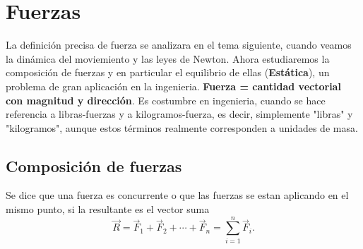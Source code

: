 \documentclass[12pt,a4paper]{book}
\begin{document}
    \chapter{Fuerzas}

    La definición precisa de fuerza se analizara en el tema siguiente, cuando veamos la dinámica del moviemiento y las leyes de Newton. Ahora estudiaremos la composición de fuerzas
    y en particular el equilibrio de ellas (\textbf{Estática}), un problema de gran aplicación en la ingenieria. \textbf{Fuerza = cantidad vectorial con magnitud y dirección}.
    Es costumbre en ingenieria, cuando se hace referencia a libras-fuerzas y a kilogramos-fuerza, es decir, simplemente "libras" y "kilogramos", aunque estos términos realmente
    corresponden a unidades de masa.

    \section{Composición de fuerzas}

    \begin{mdframed}[style=mdbluebox,frametitle={Definición 1: Fuerzas concurrentes}]
        Se dice que una fuerza es concurrente o que las fuerzas se estan aplicando en el mismo punto, si la resultante es el vector suma
        \begin{equation*}
            \vec{R}=\vec{F}_{1}+\vec{F}_{2}+\cdots+\vec{F}_{n}=\sum_{i=1}^{n}\vec{F}_{i}.
        \end{equation*}
    \end{mdframed}
\end{document}
